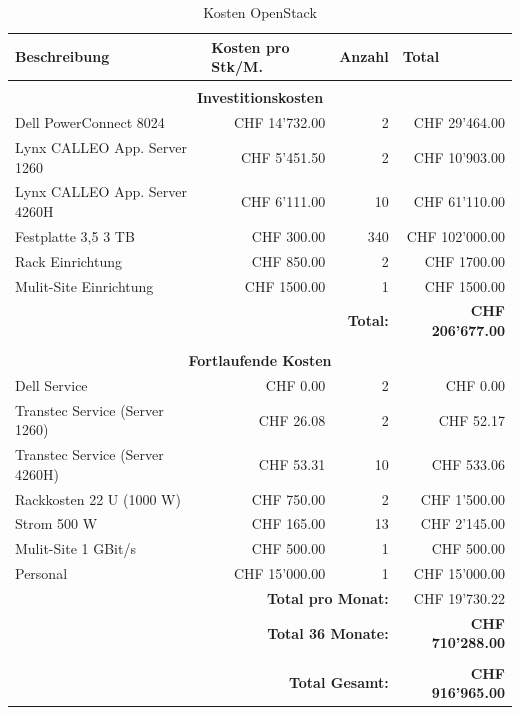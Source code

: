 \begin{table}[htbp]
\caption{Kosten OpenStack}
\begin{small}
\begin{tabular}{|l|r|r|r|}
\hline
\textbf{Beschreibung} & \multicolumn{1}{l|}{\textbf{Kosten pro Stk/M.}} & \multicolumn{1}{l|}{\textbf{Anzahl}} & \multicolumn{1}{l|}{\textbf{Total}} \\ \hline
 \multicolumn{ 4}{c}{} \\ \hline
\multicolumn{ 4}{|c|}{\textbf{Investitionskosten}} \\ \hline
Dell PowerConnect 8024 & CHF 14'732.00 & 2 & CHF 29'464.00 \\ \hline
Lynx CALLEO App. Server 1260 & CHF 5'451.50 & 2 & CHF 10'903.00 \\ \hline
Lynx CALLEO App. Server 4260H & CHF 6'111.00 & 10 & CHF 61'110.00 \\ \hline
Festplatte 3,5 3 TB & CHF 300.00 & 340 & CHF 102'000.00 \\ \hline
Rack Einrichtung & CHF 850.00 & 2 & CHF 1700.00 \\ \hline \hline
Mulit-Site Einrichtung & CHF 1500.00 & 1 & CHF 1500.00 \\ \hline \hline
 \multicolumn{ 3}{r|}{\textbf{Total:}} & \textbf{CHF 206'677.00} \\ \cline{4-4}
\multicolumn{ 4}{c}{} \\ \hline
\multicolumn{ 4}{|c|}{\textbf{Fortlaufende Kosten}} \\ \hline
Dell Service & CHF 0.00 & 2 & CHF 0.00 \\ \hline
Transtec Service (Server 1260) & CHF 26.08 & 2 & CHF 52.17 \\ \hline
Transtec Service (Server 4260H) & CHF 53.31 & 10 & CHF 533.06 \\ \hline
Rackkosten 22 U (1000 W) & CHF 750.00 & 2 & CHF 1'500.00 \\ \hline
Strom 500 W & CHF 165.00 & 13 & CHF 2'145.00 \\ \hline
Mulit-Site 1 GBit/s & CHF 500.00 & 1 & CHF 500.00 \\ \hline
Personal & CHF 15'000.00 & 1 & CHF 15'000.00 \\ \hline \hline
 \multicolumn{ 3}{r|}{\textbf{Total pro Monat:}} & CHF 19'730.22 \\ \cline{4-4}
 \multicolumn{ 3}{r|}{\textbf{Total 36 Monate:}} & \textbf{CHF 710'288.00} \\ \cline{4-4}
 \multicolumn{ 4}{c}{} \\ \cline{4-4}
 \multicolumn{ 3}{r|}{\textbf{Total Gesamt:}} & \textbf{CHF 916'965.00} \\ \cline{4-4}
\end{tabular}
\end{small}
\label{tab:KostenOpenStackS2}
\end{table}


